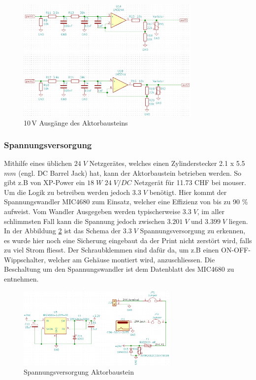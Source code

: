 \begin{figure}[h!]
	\centering
	\includegraphics[width=0.8\textwidth]{graphics/shematics_aktor_output.png}
	\caption{10\,V Ausgänge des Aktorbausteins}
	\label{pic: Output_aktor}
\end{figure}
\newpage
\subsubsection{Spannungsversorgung}
Mithilfe eines üblichen $24\;V$ Netzgerätes, welches einen Zylinderstecker 2.1 x 5.5 $mm$ (engl. DC Barrel Jack) hat, kann der Aktorbaustein betrieben werden. So gibt z.B von XP-Power ein $18\;W$  $24\;V/DC$ Netzgerät für 11.73 CHF bei mouser. Um die Logik zu betreiben werden jedoch $3.3\;V$ benötigt. Hier kommt der Spannungswandler MIC4680 zum Einsatz, welcher eine Effizienz von bis zu 90 \% aufweist. Vom Wandler Ausgegeben werden typischerweise $3.3\;V$, im aller schlimmsten Fall kann die Spannung jedoch zwischen $3.201\;V$ und $3.399\;V$ liegen. In der Abbildung \ref{pic: Versorgung_aktor} ist das Schema der $3.3\;V$ Spannungsversorgung zu erkennen, es wurde hier noch eine Sicherung eingebaut da der Print nicht zerstört wird, falls zu viel Strom fliesst. Der Schraubklemmen sind dafür da, um z.B einen ON-OFF-Wippschalter, welcher am Gehäuse montiert wird, anzuschliessen. Die Beschaltung um den Spannungswandler ist dem Datenblatt des MIC4680 zu entnehmen.
\begin{figure}[h!]
	\centering
	\includegraphics[width=0.7\textwidth]{graphics/shematics_aktor_33V.png}
	\caption{Spannungsversorgung Aktorbaustein}
	\label{pic: Versorgung_aktor}
\end{figure}
\newpage
